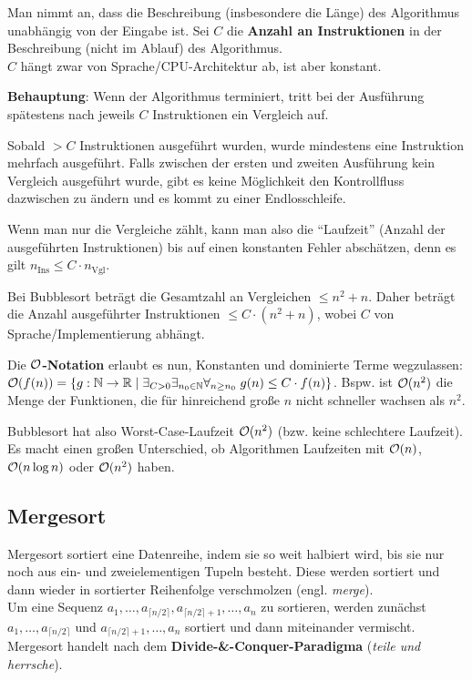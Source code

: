 Man nimmt an, dass die Beschreibung (insbesondere die Länge) des Algorithmus
unabhängig von der Eingabe ist.
Sei $C$ die \textbf{Anzahl an Instruktionen} in der Beschreibung
(nicht im Ablauf) des Algorithmus. \\
$C$ hängt zwar von Sprache/CPU-Architektur ab, ist aber konstant.

\textbf{Behauptung}: Wenn der Algorithmus terminiert, tritt bei der Ausführung
spätestens nach jeweils $C$ Instruktionen ein Vergleich auf.

\begin{Beweis}
    Sobald $> C$ Instruktionen ausgeführt wurden, wurde mindestens
    eine Instruktion mehrfach ausgeführt.
    Falls zwischen der ersten und zweiten Ausführung kein Vergleich ausgeführt
    wurde, gibt es keine Möglichkeit den Kontrollfluss dazwischen zu ändern
    und es kommt zu einer Endlosschleife.
\end{Beweis}

Wenn man nur die Vergleiche zählt, kann man also die "`Laufzeit"' (Anzahl der
ausgeführten Instruktionen) bis auf einen konstanten Fehler abschätzen, denn
es gilt $n_{\text{Ins}} \le C \cdot n_{\text{Vgl}}$.

\linie

Bei Bubblesort beträgt die Gesamtzahl an Vergleichen $\le n^2 + n$.
Daher beträgt die Anzahl ausgeführter Instruktionen $\le C \cdot (n^2 + n)$,
wobei $C$ von Sprache/Implementierung abhängt.

Die \textbf{$\mathcal{O}$-Notation} erlaubt es nun, Konstanten und dominierte Terme
wegzulassen: \\
$\mathcal{O}(f(n)) = \{g: \mathbb{N} \rightarrow \mathbb{R} \;|\;
\exists_{C > 0} \exists_{n_0 \in \mathbb{N}} \forall_{n \ge n_0}\;
g(n) \le C \cdot f(n)\}$.
Bspw. ist $\mathcal{O}(n^2)$ die Menge der Funktionen, die für hinreichend große $n$
nicht schneller wachsen als $n^2$.

Bubblesort hat also Worst-Case-Laufzeit $\mathcal{O}(n^2)$
(bzw. keine schlechtere Laufzeit).
Es macht einen großen Unterschied, ob Algorithmen Laufzeiten mit
$\mathcal{O}(n)$, $\mathcal{O}(n \log n)$ oder $\mathcal{O}(n^2)$ haben.

\subsection{%
    Mergesort%
}

Mergesort sortiert eine Datenreihe, indem sie so weit halbiert wird, bis sie
nur noch aus ein- und zweielementigen Tupeln besteht.
Diese werden sortiert und dann wieder in sortierter Reihenfolge verschmolzen
(engl. \emph{merge}). \\
Um eine Sequenz $a_1, \ldots, a_{\lceil n/2 \rceil},
a_{\lceil n/2 \rceil + 1}, \ldots, a_n$ zu sortieren, werden zunächst
$a_1, \ldots, a_{\lceil n/2 \rceil}$ und
$a_{\lceil n/2 \rceil + 1}, \ldots, a_n$ sortiert und dann miteinander
vermischt. \\
Mergesort handelt nach dem \textbf{Divide-\&-Conquer-Paradigma}
(\emph{teile und herrsche}).

